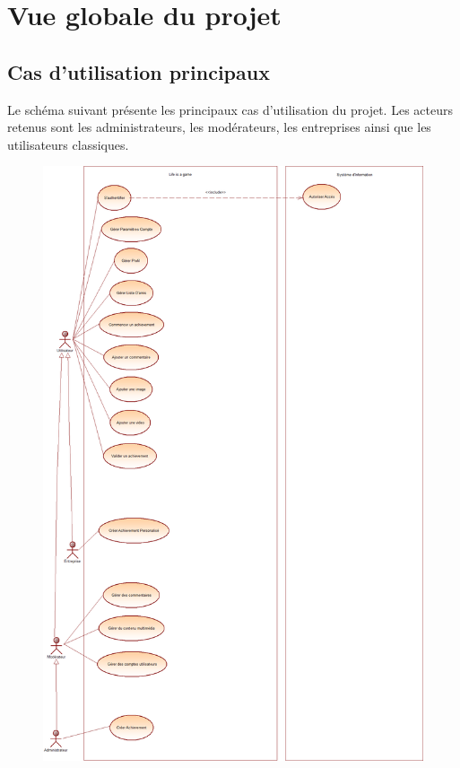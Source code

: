 \documentclass{life-fr}
\begin{document}

\chapter{Vue globale du projet}
\section{Cas d'utilisation principaux}

Le schéma suivant présente les principaux cas d'utilisation du projet. Les acteurs retenus sont les administrateurs, les modérateurs, les entreprises ainsi que les utilisateurs classiques.

\newpage

\begin{figure}[H]
  \begin{center}
    \includegraphics[width=15cm]{img/use_case_principaux.png}
  \end{center}
\end{figure}
\end{document}
